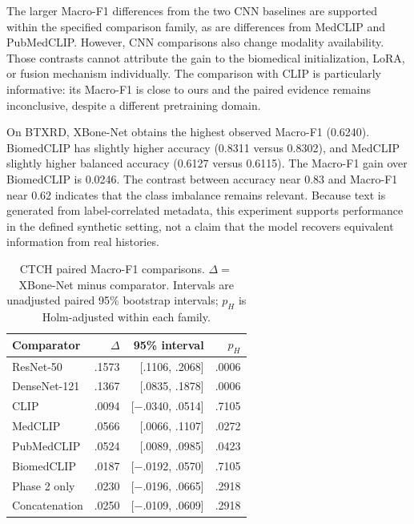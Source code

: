 \documentclass{llncs}
\begin{document}
The larger Macro-F1 differences from the two CNN baselines are supported within the specified comparison family, as are differences from MedCLIP and PubMedCLIP. However, CNN comparisons also change modality availability. Those contrasts cannot attribute the gain to the biomedical initialization, LoRA, or fusion mechanism individually. The comparison with CLIP is particularly informative: its Macro-F1 is close to ours and the paired evidence remains inconclusive, despite a different pretraining domain.

On BTXRD, XBone-Net obtains the highest observed Macro-F1 (0.6240). BiomedCLIP has slightly higher accuracy (0.8311 versus 0.8302), and MedCLIP slightly higher balanced accuracy (0.6127 versus 0.6115). The Macro-F1 gain over BiomedCLIP is 0.0246. The contrast between accuracy near 0.83 and Macro-F1 near 0.62 indicates that the class imbalance remains relevant. Because text is generated from label-correlated metadata, this experiment supports performance in the defined synthetic setting, not a claim that the model recovers equivalent information from real histories.

\begin{table}[t]
\caption{CTCH paired Macro-F1 comparisons. $\Delta=$XBone-Net minus comparator. Intervals are unadjusted paired 95\% bootstrap intervals; $p_H$ is Holm-adjusted within each family.}
\label{tab:paired}
\centering\small
\begin{tabular}{@{}lrrr@{}}
\toprule
Comparator & $\Delta$ & 95\% interval & $p_H$ \\
\midrule
ResNet-50 & .1573 & [.1106, .2068] & .0006 \\
DenseNet-121 & .1367 & [.0835, .1878] & .0006 \\
CLIP & .0094 & [$-$.0340, .0514] & .7105 \\
MedCLIP & .0566 & [.0066, .1107] & .0272 \\
PubMedCLIP & .0524 & [.0089, .0985] & .0423 \\
BiomedCLIP & .0187 & [$-$.0192, .0570] & .7105 \\
\midrule
Phase 2 only & .0230 & [$-$.0196, .0665] & .2918 \\
Concatenation & .0250 & [$-$.0109, .0609] & .2918 \\
\bottomrule
\end{tabular}
\end{table}
\end{document}
